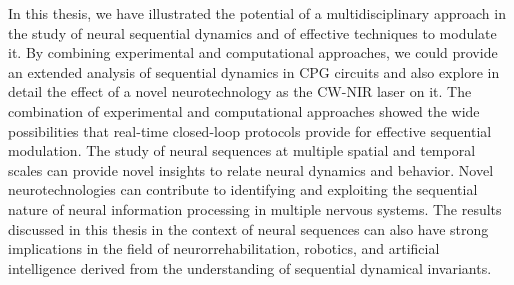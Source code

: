 In this thesis, we have illustrated the potential of a multidisciplinary approach in the study of neural sequential dynamics and of effective techniques to modulate it. By combining experimental and computational approaches, we could provide an extended analysis of sequential dynamics in CPG circuits and also explore in detail the effect of a novel neurotechnology as the CW-NIR laser on it. The combination of experimental and computational approaches showed the wide possibilities that real-time closed-loop protocols provide for effective sequential modulation. The study of neural sequences at multiple spatial and temporal scales can provide novel insights to relate neural dynamics and behavior. Novel neurotechnologies can contribute to identifying and exploiting the sequential nature of neural information processing in multiple nervous systems. The results discussed in this thesis in the context of neural sequences can also have strong implications in the field of neurorrehabilitation, robotics, and artificial intelligence derived from the understanding of sequential dynamical invariants. 




